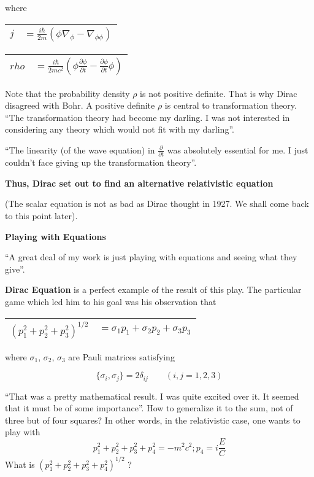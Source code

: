 where

\begin{tabular}{|cc|}
\hline
$j$ & $= \frac{i \hbar}{2m} (\phi \nabla_{\phi} - \nabla_{\phi \phi} )$\\
\hline
\end{tabular}

\begin{tabular}{|cc|}
\hline
$rho$ & $= \frac{i \hbar}{2mc^{2}} (\phi \frac{\partial \phi}{\partial t} - \frac{\partial \phi}{\partial t} \phi )$\\
\hline
\end{tabular}

Note that the probability density $\rho$ is not positive definite. That is why Dirac disagreed with Bohr. A positive definite $\rho$ is central to transformation theory. “The transformation theory had become my darling. I was not interested in considering any theory which would not fit with my darling”.

“The linearity (of the wave equation) in $\frac{\partial}{ \partial t}$  was absolutely essential for me. I just couldn’t face giving up the transformation theory”.

\textbf{Thus, Dirac set out to find an alternative relativistic equation}

(The scalar equation is not as bad as Dirac thought in 1927. We shall come back to this point later).

\textbf{Playing with Equations}

	“A great deal of my work is just playing with equations and seeing what they give”.

	\textbf{Dirac Equation} is a perfect example of the result of this play. The particular game which led him to his goal was his observation that

\begin{tabular}{|cc|}
\hline
$(p_{1}^{2} + p_{2}^{2} + p_{3}^{2})^{1/2}$ & $= \sigma_{1} p_{1} + \sigma_{2}p_{2} + \sigma_{3}p_{3}$\\
\hline
\end{tabular}

where $\sigma_{1}$, $\sigma_{2}$, $\sigma_{3}$ are Pauli matrices satisfying

$$
\{\sigma_{i}, \sigma_{j} \} = 2 \delta_{i j} \quad \quad (i, j = 1, 2, 3)
$$

“That was a pretty mathematical result. I was quite excited over it. It seemed that it must be of some importance”. How to generalize it to the sum, not of three but of four squares? In other words, in the relativistic case, one wants to play with
$$
p_{1}^{2} + p_{2}^{2} + p_{3}^{2} + p_{4}^{2} = - m^{2} c^{2} ; p_{4} = i \frac{E}{C}
$$
What is $(p_{1}^{2} + p_{2}^{2} + p_{3}^{2} + p_{4}^{2})^{1/2} $ ? 

